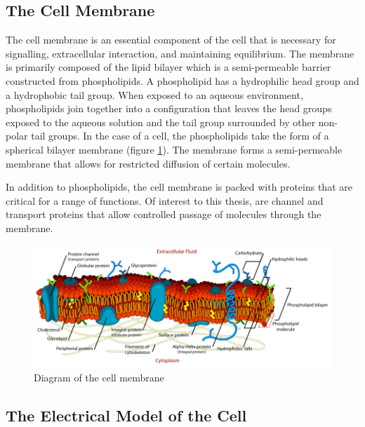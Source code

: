  \subsection{The Cell Membrane}
 \par The cell membrane is an essential component of the cell that is necessary for signalling, extracellular interaction, and maintaining equilibrium. The membrane is primarily composed of the lipid bilayer which is a semi-permeable barrier constructed from phospholipids. A phospholipid has a hydrophilic head group and a hydrophobic tail group. When exposed to an aqueous environment, phospholipids join together into a configuration that leaves the head groups exposed to the aqueous solution and the tail group surrounded by other non-polar tail groups. In the case of a cell, the phospholipids take the form of a spherical bilayer membrane (figure \ref{fig:cell_membrane}). The membrane forms a semi-permeable membrane that allows for restricted diffusion of certain molecules. 
 
 \par In addition to phospholipids, the cell membrane is packed with proteins that are critical for a range of functions. Of interest to this thesis, are channel and transport proteins that allow controlled passage of molecules through the membrane. 
 
 \begin{figure}[h]
    \centering
    \includegraphics[width=\textwidth]{images/Cell_membrane_detailed_diagram.png}
    \caption[Diagram of the cell membrane]{Diagram of the cell membrane \cite{mariana_ruiz_cell_????}}
    \label{fig:cell_membrane}
 \end{figure}
 
 
\subsection{The Electrical Model of the Cell}

